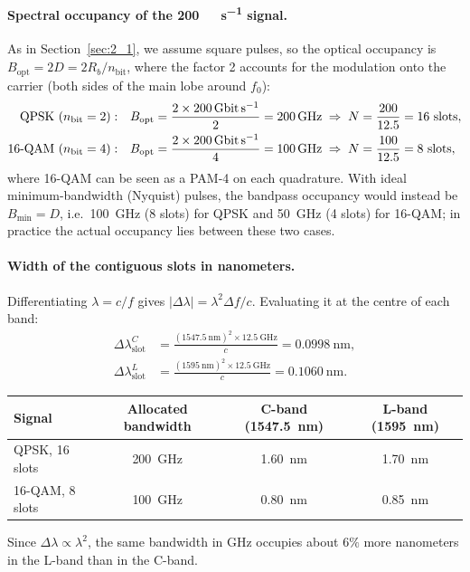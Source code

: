 \paragraph{Spectral occupancy of the \SI{200}{\giga\bit\per\second} signal.}
As in Section~\ref{sec:2_1}, we assume square pulses, so the optical occupancy is
$B_\mathrm{opt} = 2D = 2R_b/n_\mathrm{bit}$, where the factor 2 accounts for the modulation onto the carrier
(both sides of the main lobe around $f_0$):
\begin{align}
  \text{QPSK } (n_\mathrm{bit}=2):\quad & B_\mathrm{opt} = \frac{2\times\SI{200}{\giga\bit\per\second}}{2} = \SI{200}{\giga\hertz}
  \;\Rightarrow\; N = \frac{200}{12.5} = 16 \text{ slots},\\
  \text{16-QAM } (n_\mathrm{bit}=4):\quad & B_\mathrm{opt} = \frac{2\times\SI{200}{\giga\bit\per\second}}{4} = \SI{100}{\giga\hertz}
  \;\Rightarrow\; N = \frac{100}{12.5} = 8 \text{ slots},
\end{align}
where 16-QAM can be seen as a PAM-4 on each quadrature.
With ideal minimum-bandwidth (Nyquist) pulses, the bandpass occupancy would instead be $B_\mathrm{min} = D$, i.e.\
\SI{100}{\giga\hertz} (8 slots) for QPSK and \SI{50}{\giga\hertz} (4 slots) for 16-QAM; in practice the actual
occupancy lies between these two cases.

\paragraph{Width of the contiguous slots in nanometers.}
Differentiating $\lambda = c/f$ gives $|\Delta\lambda| = \lambda^2\Delta f/c$. Evaluating it at the centre of each band:
\begin{align}
  \Delta\lambda_\mathrm{slot}^{C} &= \frac{(\SI{1547.5}{\nano\metre})^2\times\SI{12.5}{\giga\hertz}}{c} = \SI{0.0998}{\nano\metre},\\
  \Delta\lambda_\mathrm{slot}^{L} &= \frac{(\SI{1595}{\nano\metre})^2\times\SI{12.5}{\giga\hertz}}{c} = \SI{0.1060}{\nano\metre}.
\end{align}
\begin{center}
\begin{tabular}{lccc}
  \toprule
  Signal & Allocated bandwidth & C-band (\SI{1547.5}{\nano\metre}) & L-band (\SI{1595}{\nano\metre}) \\
  \midrule
  QPSK, 16 slots   & \SI{200}{\giga\hertz} & \SI{1.60}{\nano\metre} & \SI{1.70}{\nano\metre} \\
  16-QAM, 8 slots  & \SI{100}{\giga\hertz} & \SI{0.80}{\nano\metre} & \SI{0.85}{\nano\metre} \\
  \bottomrule
\end{tabular}
\end{center}
Since $\Delta\lambda\propto\lambda^2$, the same bandwidth in GHz occupies about $6\%$ more nanometers in the
L-band than in the C-band.
